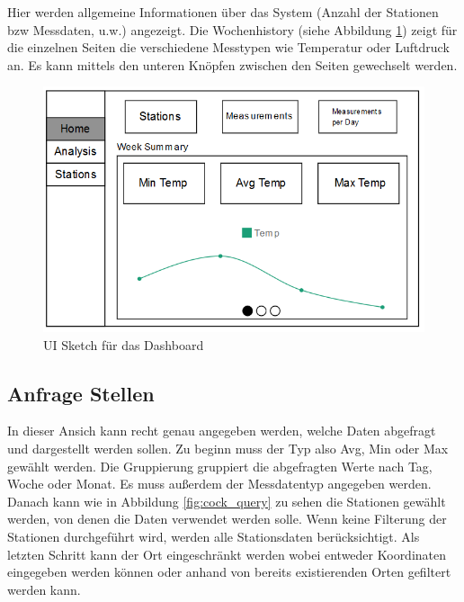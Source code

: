 Hier werden allgemeine Informationen über das System (Anzahl der Stationen bzw Messdaten, u.w.) angezeigt. Die Wochenhistory (siehe Abbildung \ref{fig:cock_dash}) zeigt für die einzelnen Seiten die verschiedene Messtypen wie Temperatur oder Luftdruck an. Es kann mittels den unteren Knöpfen zwischen den Seiten gewechselt werden.

\begin{figure}[H]
\centering
\includegraphics[width=1\textwidth]{pictures/sketches/cockpit/cockpit_home.png}
\caption{UI Sketch für das Dashboard}
\label{fig:cock_dash}
\end{figure}
\raggedright
\newpage

\subsection{Anfrage Stellen}
In dieser Ansich kann recht genau angegeben werden, welche Daten abgefragt und dargestellt werden sollen. Zu beginn muss der Typ also Avg, Min oder Max gewählt werden. Die Gruppierung gruppiert die abgefragten Werte nach Tag, Woche oder Monat. Es muss außerdem der Messdatentyp angegeben werden. Danach kann wie in Abbildung \ref{fig:cock_query} zu sehen die Stationen gewählt werden, von denen die Daten verwendet werden solle. Wenn keine Filterung der Stationen durchgeführt wird, werden alle Stationsdaten berücksichtigt. Als letzten Schritt kann der Ort eingeschränkt werden wobei entweder Koordinaten eingegeben werden können oder anhand von bereits existierenden Orten gefiltert werden kann.

